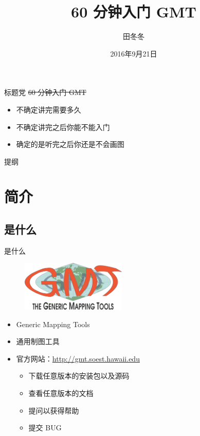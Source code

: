 \documentclass[UTF8, 11pt]{ctexbeamer}
\title{60 分钟入门 GMT}
\author{田冬冬}
\date{2016年9月21日}
\institute{中国科学技术大学}
\begin{document}
\begin{frame}
\titlepage
\end{frame}

\begin{frame}[<+->]{标题党}
\sout{60 分钟入门 GMT}
\pause
\begin{itemize}
\item 不确定讲完需要多久
\item 不确定讲完之后你能不能入门
\item 确定的是听完之后你还是不会画图
\end{itemize}
\end{frame}

\begin{frame}{提纲}
\small
\tableofcontents[hidesubsections]
\end{frame}

\section{简介}
\subsection{是什么}
\begin{frame}{是什么}
\begin{figure}
\includegraphics[width=5cm]{GMT_logo}
\end{figure}
\begin{itemize}
\item Generic Mapping Tools
\item 通用制图工具
\item 官方网站：\url{http://gmt.soest.hawaii.edu}
    \begin{itemize}
    \item 下载任意版本的安装包以及源码
    \item 查看任意版本的文档
    \item 提问以获得帮助
    \item 提交 BUG
    \end{itemize}
\end{itemize}
\end{frame}
\end{document}
